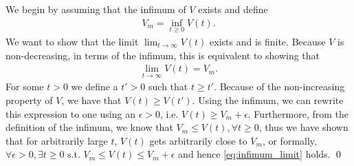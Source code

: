 \documentclass[]{article}
\begin{document}
\section{}
We begin by assuming that the infimum of $V$ exists and define
\begin{equation}\begin{aligned}
V_m = \inf_{t\geq 0}V(t).
\end{aligned}\end{equation}
We want to show that the limit $\lim_{t\rightarrow \infty}V(t)$ exists and is finite. Because $V$ is non-decreasing, in terms of the infimum, this is equivalent to showing that
\begin{equation}\begin{aligned}
\label{eq:infimum_limit}
\lim_{t \rightarrow \infty} V(t) = V_m.
\end{aligned}\end{equation}
For some $t > 0$ we define a $t' > 0$ such that $t \geq t'$. Because of the non-increasing property of $V$, we have that $V(t) \geq V(t')$. Using the infimum, we can rewrite this expression to one using an $\epsilon > 0$, i.e. $V(t) \geq V_m + \epsilon$. Furthermore, from the definition of the infimum, we know that $V_m \leq V(t), \forall t\geq 0$, thus we have shown that for arbitrarily large $t$, $V(t)$ gets arbitrarily close to $V_m$, or formally, $\forall \epsilon > 0, \exists t \geq 0 \text{ s.t. } V_m \leq V(t) \leq V_m + \epsilon$ and hence \eqref{eq:infimum_limit} holds. \qed
\end{document}
